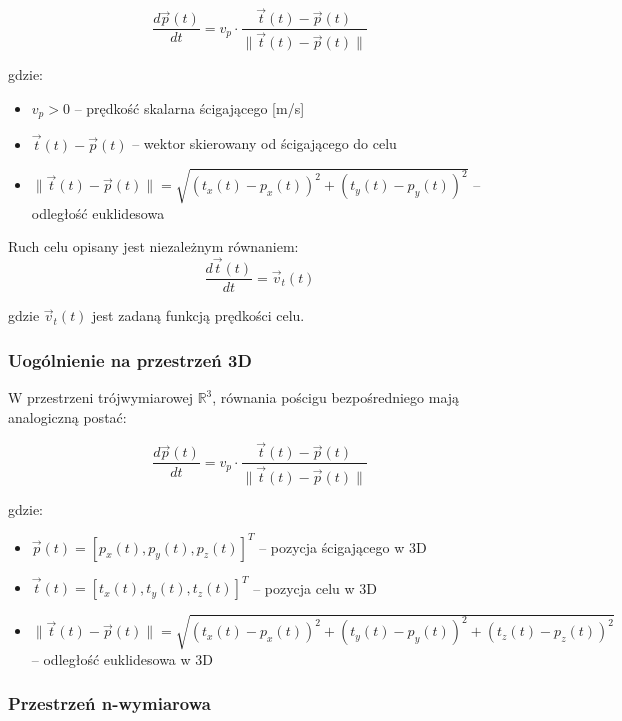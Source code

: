 \documentclass[12pt,a4paper]{article}
\begin{document}
\begin{equation}
\frac{d\vec{p}(t)}{dt} = v_p \cdot \frac{\vec{t}(t) - \vec{p}(t)}{\|\vec{t}(t) - \vec{p}(t)\|}
\label{eq:direct_pursuit_2d}
\end{equation}

gdzie:
\begin{itemize}
    \item $v_p > 0$ -- prędkość skalarna ścigającego [m/s]
    \item $\vec{t}(t) - \vec{p}(t)$ -- wektor skierowany od ścigającego do celu
    \item $\|\vec{t}(t) - \vec{p}(t)\| = \sqrt{(t_x(t) - p_x(t))^2 + (t_y(t) - p_y(t))^2}$ -- odległość euklidesowa
\end{itemize}

Ruch celu opisany jest niezależnym równaniem:
\begin{equation}
\frac{d\vec{t}(t)}{dt} = \vec{v}_t(t)
\label{eq:target_motion}
\end{equation}

gdzie $\vec{v}_t(t)$ jest zadaną funkcją prędkości celu.

\subsubsection{Uogólnienie na przestrzeń 3D}

W przestrzeni trójwymiarowej $\mathbb{R}^3$, równania pościgu bezpośredniego mają analogiczną postać:

\begin{equation}
\frac{d\vec{p}(t)}{dt} = v_p \cdot \frac{\vec{t}(t) - \vec{p}(t)}{\|\vec{t}(t) - \vec{p}(t)\|}
\end{equation}

gdzie:
\begin{itemize}
    \item $\vec{p}(t) = [p_x(t), p_y(t), p_z(t)]^T$ -- pozycja ścigającego w 3D
    \item $\vec{t}(t) = [t_x(t), t_y(t), t_z(t)]^T$ -- pozycja celu w 3D
    \item $\|\vec{t}(t) - \vec{p}(t)\| = \sqrt{(t_x(t) - p_x(t))^2 + (t_y(t) - p_y(t))^2 + (t_z(t) - p_z(t))^2}$ -- odległość euklidesowa w 3D
\end{itemize}

\subsubsection{Przestrzeń n-wymiarowa}
\end{document}
